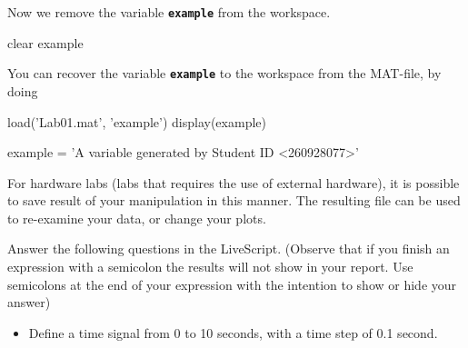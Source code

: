 \documentclass{article}
\begin{document}
\begin{par}
\begin{flushleft}
Now we remove the variable \texttt{\textbf{example}} from the workspace.
\end{flushleft}
\end{par}

\begin{matlabcode}
clear example
\end{matlabcode}


\begin{par}
\begin{flushleft}
You can recover the variable \texttt{\textbf{example}} to the workspace from the MAT-file, by doing
\end{flushleft}
\end{par}

\begin{matlabcode}
load('Lab01.mat', 'example')
display(example)
\end{matlabcode}
\begin{matlaboutput}
example = 'A variable generated by Student ID <260928077>'
\end{matlaboutput}


\begin{par}
\begin{flushleft}
For hardware labs (labs that requires the use of external hardware), it is possible to save result of your manipulation in this manner. The resulting file can be used to re-examine your data, or change your plots.
\end{flushleft}
\end{par}


\begin{par}
\begin{flushleft}
Answer the following questions in the LiveScript. (Observe that if you finish an expression with a semicolon the results will not show in your report. Use semicolons at the end of your expression with the intention to show or hide your answer)
\end{flushleft}
\end{par}

\begin{itemize}
\setlength{\itemsep}{-1ex}
   \item{\begin{flushleft} Define a time signal from 0 to 10 seconds, with a time step of 0.1 second. \end{flushleft}}
\end{itemize}
\end{document}
